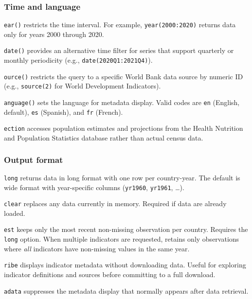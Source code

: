\documentclass[bib]{statapress}
\begin{document}
\subsubsection*{Time and language}

\hangpara
\texttt{ear(\ststring)} restricts the time interval. For example, \texttt{year(2000:2020)} returns data only for years 2000 through 2020.

\hangpara
\texttt{date(\ststring)} provides an alternative time filter for series that
support quarterly or monthly periodicity (e.g., \texttt{date(2020Q1:2021Q4)}).

\hangpara
\texttt{ource(\ststring)} restricts the query to a specific World
Bank data source by numeric ID (e.g., \texttt{source(2)} for World Development
Indicators).

\hangpara
\texttt{anguage(\ststring)} sets the language for metadata display. Valid codes are \texttt{en} (English, default), \texttt{es} (Spanish), and \texttt{fr} (French).

\hangpara
\texttt{ection} accesses population estimates and projections from the Health Nutrition and Population Statistics database rather than actual census data.

\subsubsection*{Output format}

\hangpara
\texttt{long} returns data in long format with one row per country-year. The default is wide format with year-specific columns (\texttt{yr1960}, \texttt{yr1961}, \ldots).

\hangpara
\texttt{clear} replaces any data currently in memory. Required if data are already loaded.

\hangpara
\texttt{est} keeps only the most recent non-missing observation per country. Requires the \texttt{long} option. When multiple indicators are requested, retains only observations where \textit{all} indicators have non-missing values in the same year.

\hangpara
\texttt{ribe} displays indicator metadata without downloading data. Useful for exploring indicator definitions and sources before committing to a full download.

\hangpara
\texttt{adata} suppresses the metadata display that normally appears after data retrieval.
\end{document}
